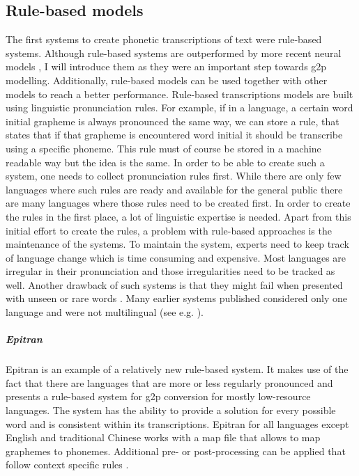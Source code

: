 \subsection{Rule-based models}
The first systems to create phonetic transcriptions of text were rule-based systems. Although rule-based systems are outperformed by more recent neural models \citep{Ashby-Bartley.2021, gorman-etal-2020-sigmorphon}, I will introduce them as they were an important step towards \ac{g2p} modelling. Additionally, rule-based models can be used together with other models to reach a better performance. Rule-based transcriptions models are built using linguistic pronunciation rules. For example, if in a language, a certain word initial grapheme is always pronounced the same way, we can store a rule, that states that if that grapheme is encountered word initial it should be transcribe using a specific phoneme. This rule must of course be stored in a machine readable way but the idea is the same. In order to be able to create such a system, one needs to collect pronunciation rules first. While there are only few languages where such rules are ready and available for the general public there are many languages where those rules need to be created first. In order to create the rules in the first place, a lot of linguistic expertise is needed. Apart from this initial effort to create the rules, a problem with rule-based approaches is the maintenance of the systems. To maintain the system, experts need to keep track of language change which is time consuming and expensive. Most languages are irregular in their pronunciation and those irregularities need to be tracked as well. Another drawback of such systems is that they might fail when presented with unseen or rare words \citep{ney-joint-sequence2008}. Many earlier systems published considered only one language and were not multilingual (see e.g. \citet{rule-based2009}). 

\subparagraph{Epitran} Epitran is an example of a relatively new rule-based system. It makes use of the fact that there are languages that are more or less regularly pronounced and presents a rule-based system for \ac{g2p} conversion for mostly low-resource languages. The system has the ability to provide a solution for every possible word and is consistent within its transcriptions. Epitran for all languages except English and traditional Chinese works with a map file that allows to map graphemes to phonemes. Additional pre- or post-processing can be applied that follow context specific rules \citep{mortensen-etal-2018-epitran}.



